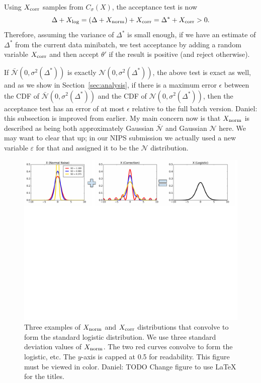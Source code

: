 \documentclass{article}
\begin{document}
Using $X_{\rm corr}$ samples from $C_\sigma(X)$, the acceptance test is now
\begin{equation}\label{eq:criteria}
    \Delta + X_{\rm log} = (\Delta + X_{\rm norm}) + X_{\rm corr} = \Delta^* + X_{\rm corr} >0.
\end{equation}
Therefore, assuming the variance of $\Delta^*$ is small enough, if we have an
estimate of $\Delta^*$ from the current data minibatch, we test acceptance by
adding a random variable $X_{\rm corr}$ and then accept $\theta'$ if the result
is positive (and reject otherwise).

If $\mathcal{\bar{N}}(0, \sigma^2(\Delta^*))$ is exactly $\mathcal{N}(0,
\sigma^2(\Delta^*))$, the above test is exact as well, and as we show in
Section~\ref{sec:analysis}, if there is a maximum error $\epsilon$ between the
CDF of $\mathcal{\bar{N}}(0, \sigma^2(\Delta^*))$ and the CDF of $\mathcal{N}(0,
\sigma^2(\Delta^*))$, then the acceptance test has an error of at most
$\epsilon$ relative to the full batch version. {\color{blue} Daniel: this
subsection is improved from earlier. My main concern now is that $X_{\rm norm}$
is described as being both approximately Gaussian $\bar{\mathcal{N}}$ and
Gaussian $\mathcal{N}$ here. We may want to clear that up; in our NIPS
submission we actually used a new variable $\varepsilon$ for that and assigned
it to be the $\mathcal{N}$ distribution.}

\begin{figure}[t]
    \centering
    \includegraphics[width=1\textwidth]{mh_convolution_diagram_v2}
    \caption{
    Three examples of $X_{\rm norm}$ and $X_{\rm corr}$ distributions that
    convolve to form the standard logistic distribution. We use three standard
    deviation values of $X_{\rm norm}$. The two red curves convolve to form the
    logistic, etc. The $y$-axis is capped at 0.5 for readability. This figure
    must be viewed in color. {\color{blue} Daniel: TODO Change figure to use
    LaTeX for the titles.}
    }
    \label{fig:deconvolution}
\end{figure}
\end{document}
